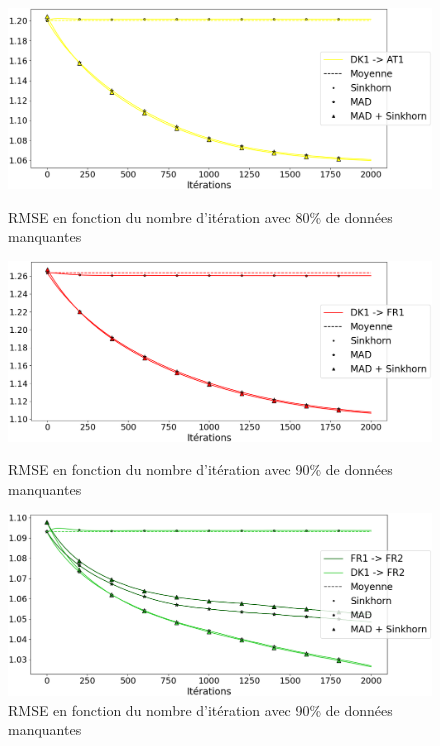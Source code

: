 \documentclass[acmsmall, natbib=false, nonacm]{acmart}
\begin{document}
\begin{figure}[H]
    \begin{minipage}[b]{0.4\linewidth}
		\centering \includegraphics[scale=0.14]{images/80_ar_AT1.png}
		\caption{RMSE en fonction du nombre d'itération avec 80\% de données manquantes}
	\end{minipage}\hfill
    \begin{minipage}[b]{0.4\linewidth}
		\centering \includegraphics[scale=0.14]{images/90_ar_FR1.png}
		\caption{RMSE en fonction du nombre d'itération avec 90\% de données manquantes}
	\end{minipage}\hfill
    \begin{minipage}[b]{0.4\linewidth}
		\centering \includegraphics[scale=0.14]{images/90_ar_FR2.png}
		\caption{RMSE en fonction du nombre d'itération avec 90\% de données manquantes}
	\end{minipage}
\end{figure}
\end{document}
